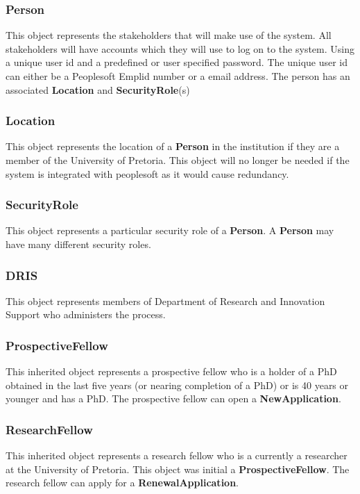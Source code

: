 \documentclass[12pt]{article}
\begin{document}
\newpage
\subsubsection{Person}
This object represents the stakeholders that will make use of the system. All stakeholders will have accounts which they will use to log on to the system. Using a unique user id and a predefined or user specified password. The unique user id can either be a Peoplesoft Emplid number or a email address. The person has an associated \textbf{Location} and \textbf{SecurityRole}(s)

\subsubsection{Location}
This object represents the location of a \textbf{Person} in the institution if they are a member of the University of Pretoria. This object will no longer be needed if the system is integrated with peoplesoft as it would cause redundancy.

\subsubsection{SecurityRole}
This object represents a particular security role of a \textbf{Person}. A \textbf{Person} may have many different security roles.
\subsubsection{DRIS}
This object represents members of Department of Research and Innovation Support who administers the process.

\subsubsection{ProspectiveFellow}
This inherited object represents a prospective fellow who is a holder of a PhD obtained in the last five years (or nearing completion of a PhD) or is 40 years or younger and has a PhD. The prospective fellow can open a \textbf{NewApplication}.

\subsubsection{ResearchFellow}
This inherited object represents a research fellow who is a currently a researcher at the University of Pretoria. This object was initial a \textbf{ProspectiveFellow}. The research fellow can apply for a \textbf{RenewalApplication}.
\end{document}
